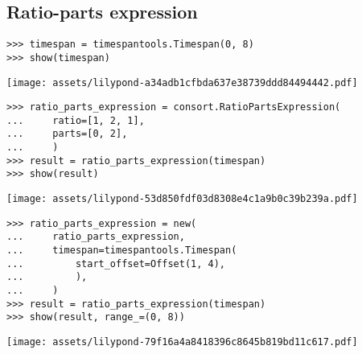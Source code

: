 \subsection{Ratio-parts expression}

\begin{comment}
<abjad>
timespan = timespantools.Timespan(0, 8)
show(timespan)
ratio_parts_expression = consort.RatioPartsExpression(
    ratio=[1, 2, 1],
    parts=[0, 2],
    )
result = ratio_parts_expression(timespan)
show(result)
</abjad>
\end{comment}

\begin{singlespacing}
\vspace{-0.5\baselineskip}
\begin{lstlisting}
>>> timespan = timespantools.Timespan(0, 8)
>>> show(timespan)
\end{lstlisting}
\noindent\texttt{[image: assets/lilypond-a34adb1cfbda637e38739ddd84494442.pdf]}
\begin{lstlisting}
>>> ratio_parts_expression = consort.RatioPartsExpression(
...     ratio=[1, 2, 1],
...     parts=[0, 2],
...     )
>>> result = ratio_parts_expression(timespan)
>>> show(result)
\end{lstlisting}
\noindent\texttt{[image: assets/lilypond-53d850fdf03d8308e4c1a9b0c39b239a.pdf]}
\end{singlespacing}

\begin{comment}
<abjad>
ratio_parts_expression = new(
    ratio_parts_expression,
    timespan=timespantools.Timespan(
        start_offset=Offset(1, 4),
        ),
    )
result = ratio_parts_expression(timespan)
show(result, range_=(0, 8))
</abjad>
\end{comment}

\begin{singlespacing}
\vspace{-0.5\baselineskip}
\begin{lstlisting}
>>> ratio_parts_expression = new(
...     ratio_parts_expression,
...     timespan=timespantools.Timespan(
...         start_offset=Offset(1, 4),
...         ),
...     )
>>> result = ratio_parts_expression(timespan)
>>> show(result, range_=(0, 8))
\end{lstlisting}
\noindent\texttt{[image: assets/lilypond-79f16a4a8418396c8645b819bd11c617.pdf]}
\end{singlespacing}

